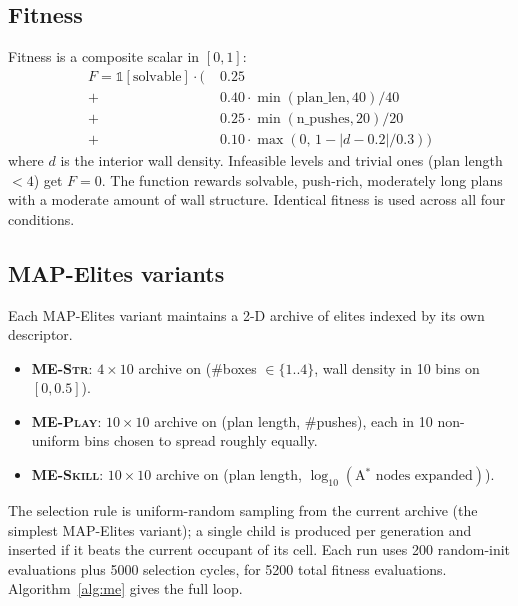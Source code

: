 \documentclass[conference]{IEEEtran}
\begin{document}
\subsection{Fitness}

Fitness is a composite scalar in $[0, 1]$:
\[
\begin{aligned}
F = \mathbb{1}[\text{solvable}] \cdot \big(\;
    & 0.25 \\
    + \;& 0.40 \cdot \min(\text{plan\_len}, 40) / 40 \\
    + \;& 0.25 \cdot \min(\text{n\_pushes}, 20) / 20 \\
    + \;& 0.10 \cdot \max(0,\, 1 - |d - 0.2| / 0.3) \big)
\end{aligned}
\]
where $d$ is the interior wall density. Infeasible levels and
trivial ones (plan length $< 4$) get $F = 0$. The function rewards
solvable, push-rich, moderately long plans with a moderate amount of
wall structure. Identical fitness is used across all four conditions.

\subsection{MAP-Elites variants}

Each MAP-Elites variant maintains a 2-D archive of elites indexed by
its own descriptor.
\begin{itemize}
    \item \textbf{\textsc{ME-Str}}: $4 \times 10$ archive on
    (\#boxes $\in \{1..4\}$, wall density in 10 bins on $[0, 0.5]$).
    \item \textbf{\textsc{ME-Play}}: $10 \times 10$ archive on
    (plan length, \#pushes), each in 10 non-uniform bins chosen to
    spread roughly equally.
    \item \textbf{\textsc{ME-Skill}}: $10 \times 10$ archive on
    (plan length, $\log_{10}(\text{A$^*$ nodes expanded})$).
\end{itemize}
The selection rule is uniform-random sampling from the current
archive (the simplest MAP-Elites variant); a single child is
produced per generation and inserted if it beats the current
occupant of its cell. Each run uses 200 random-init evaluations
plus 5000 selection cycles, for 5200 total fitness evaluations.
Algorithm~\ref{alg:me} gives the full loop.
\end{document}
